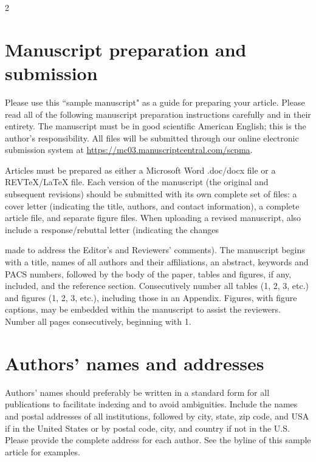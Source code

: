 \documentclass[fleqn]{2026SCGE}
\begin{document}





\maketitle



\begin{multicols}{2}
\section{Manuscript preparation and submission}\label{section1}
Please use this ``sample manuscript" as a guide for preparing your article. Please read all of the following manuscript preparation instructions carefully and in their entirety. The manuscript must be in good scientific American English; this is the author's responsibility. All files will be submitted through our online electronic submission system at \href{https://mc03.manuscriptcentral.com/scpma}{https://mc03.manuscriptcentral.com/scpma}.

Articles must be prepared as either a Microsoft Word .doc/docx file or a REVTeX/LaTeX file. Each version of the manuscript (the original and subsequent revisions) should be submitted with its own complete set of files: a cover letter (indicating the title, authors, and contact information), a complete article file, and separate figure files. When uploading a revised manuscript, also include a response/rebuttal letter (indicating the changes
\Authorfootnote

\noindent  made to address the Editor's and Reviewers' comments). The manuscript begins with a title, names of all authors and their affiliations, an abstract, keywords and PACS numbers, followed by the body of the paper, tables and figures, if any, included, and the reference section. Consecutively number all tables (1, 2, 3, etc.) and figures (1, 2, 3, etc.), including those in an Appendix. Figures, with figure captions, may be embedded within the manuscript to assist the reviewers. Number all pages consecutively, beginning with 1.

\section{Authors' names and addresses}\label{sec:2}
Authors' names should preferably be written in a standard form for all publications to facilitate indexing and to avoid ambiguities. Include the names and postal addresses of all institutions, followed by city, state, zip code, and USA if in the United States or by postal code, city, and country if not in the U.S. Please provide the complete address for each author. See the byline of this sample article for examples.


\end{multicols}
\end{document}
